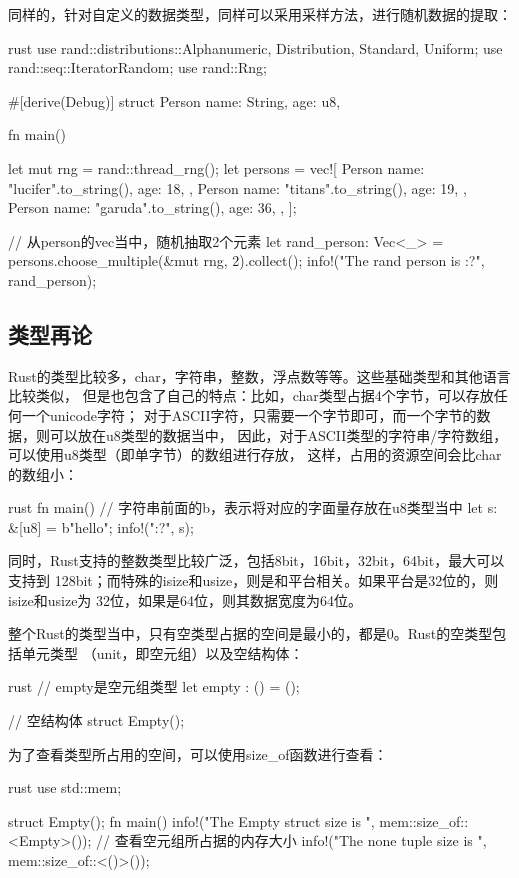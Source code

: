 同样的，针对自定义的数据类型，同样可以采用采样方法，进行随机数据的提取：
\begin{code-block}{rust}
use rand::distributions::{Alphanumeric, Distribution, Standard, Uniform};
use rand::seq::IteratorRandom;
use rand::Rng;

#[derive(Debug)]
struct Person {
    name: String,
    age: u8,
}

fn main() {
    let mut rng = rand::thread_rng();
    let persons = vec![
        Person {
            name: "lucifer".to_string(),
            age: 18,
        },
        Person {
            name: "titans".to_string(),
            age: 19,
        },
        Person {
            name: "garuda".to_string(),
            age: 36,
        },
    ];

    // 从person的vec当中，随机抽取2个元素
    let rand_person: Vec<_> = persons.choose_multiple(&mut rng, 2).collect();
    info!("The rand person is {:?}", rand_person);
}
\end{code-block}

\subsection{类型再论}
Rust的类型比较多，char，字符串，整数，浮点数等等。这些基础类型和其他语言比较类似，
但是也包含了自己的特点：比如，char类型占据4个字节，可以存放任何一个unicode字符；
对于ASCII字符，只需要一个字节即可，而一个字节的数据，则可以放在u8类型的数据当中，
因此，对于ASCII类型的字符串/字符数组，可以使用u8类型（即单字节）的数组进行存放，
这样，占用的资源空间会比char的数组小：
\begin{code-block}{rust}
fn main() {
    // 字符串前面的b，表示将对应的字面量存放在u8类型当中
    let s: &[u8] = b"hello";
    info!("{:?}", s);
}
\end{code-block}
同时，Rust支持的整数类型比较广泛，包括8bit，16bit，32bit，64bit，最大可以支持到
128bit；而特殊的isize和usize，则是和平台相关。如果平台是32位的，则isize和usize为
32位，如果是64位，则其数据宽度为64位。

整个Rust的类型当中，只有空类型占据的空间是最小的，都是0。Rust的空类型包括单元类型
（unit，即空元组）以及空结构体：
\begin{code-block}{rust}
// empty是空元组类型
let empty : () = ();

// 空结构体
struct Empty();
\end{code-block}
为了查看类型所占用的空间，可以使用size\_of函数进行查看：
\begin{code-block}{rust}
use std::mem;

struct Empty();
fn main() {
    info!("The Empty struct size is {}", mem::size_of::<Empty>());
    // 查看空元组所占据的内存大小
    info!("The none tuple size is {}", mem::size_of::<()>());
}
\end{code-block}

